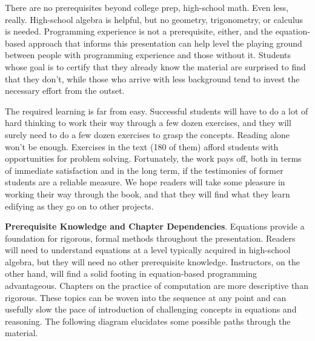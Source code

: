 \begin{preface}
There are no prerequisites beyond college prep, high-school math.
Even less, really.
High-school algebra is helpful,
but no geometry, trigonometry, or calculus is needed.
Programming experience is not a prerequisite, either, and
the equation-based approach that informs this presentation can
help level the playing ground between people
with programming experience and those without it.
Students whose goal is to certify that they already
know the material are surprised to find that they don't,
while those who arrive with less background tend
to invest the necessary effort from the outset.

The required learning is far from easy.
Successful students will have to do a lot of hard thinking
to work their way through a few dozen exercises,
and they will surely need to do a few dozen exercises to grasp the concepts.
Reading alone won't be enough.
Exercises in the text (180 of them) afford students with opportunities
for problem solving.
Fortunately, the work pays off, both in terms of immediate satisfaction
and in the long term, if the testimonies of former students are a
reliable measure.
We hope readers will take some pleasure in working their way through
the book, and that they will find what they learn
edifying as they go on to other projects.

\vspace{0.5cm}
{\parindent0pt
\textbf{Prerequisite Knowledge and Chapter Dependencies}.
\label{ch:roadmap}
Equations provide a foundation
for rigorous, formal methods throughout the presentation.
Readers will need to understand equations at a level
typically acquired in high-school algebra, but they will need
no other prerequisite knowledge.
Instructors, on the other hand, will find
a solid footing in equation-based programming advantageous.
Chapters on the practice of computation are more descriptive than rigorous.
These topics can be woven into the sequence at any point
and can usefully slow the pace of introduction
of challenging concepts in equations and reasoning.
The following diagram elucidates some possible
paths through the material.}
\\ %


\end{preface}
